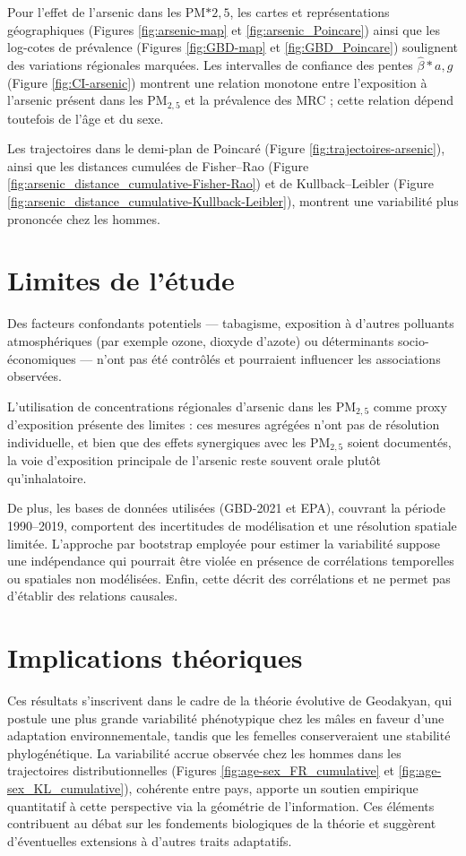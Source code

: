 Pour l'effet de l'arsenic dans les PM$*{2,5}$, les cartes et représentations géographiques (Figures \ref{fig:arsenic-map} et \ref{fig:arsenic_Poincare}) ainsi que les log-cotes de prévalence (Figures \ref{fig:GBD-map} et \ref{fig:GBD_Poincare}) soulignent des variations régionales marquées. Les intervalles de confiance des pentes $\hat{\beta}*{a,g}$ (Figure \ref{fig:CI-arsenic}) montrent une relation monotone entre l'exposition à l'arsenic présent dans les PM$_{2,5}$ et la prévalence des MRC ; cette relation dépend toutefois de l'âge et du sexe.

Les trajectoires dans le demi-plan de Poincaré (Figure \ref{fig:trajectoires-arsenic}), ainsi que les distances cumulées de Fisher–Rao (Figure \ref{fig:arsenic_distance_cumulative-Fisher-Rao}) et de Kullback–Leibler (Figure \ref{fig:arsenic_distance_cumulative-Kullback-Leibler}), montrent une variabilité plus prononcée chez les hommes.

\section{Limites de l'étude}

Des facteurs confondants potentiels — tabagisme, exposition à d'autres polluants atmosphériques (par exemple ozone, dioxyde d'azote) ou déterminants socio-économiques — n'ont pas été contrôlés et pourraient influencer les associations observées. 

L'utilisation de concentrations régionales d'arsenic dans les PM$_{2,5}$ comme proxy d'exposition présente des limites : ces mesures agrégées n'ont pas de résolution individuelle, et bien que des effets synergiques avec les PM$_{2,5}$ soient documentés, la voie d'exposition principale de l'arsenic reste souvent orale plutôt qu'inhalatoire.

De plus, les bases de données utilisées (GBD-2021 et EPA), couvrant la période 1990–2019, comportent des incertitudes de modélisation et une résolution spatiale limitée. L'approche par bootstrap employée pour estimer la variabilité suppose une indépendance qui pourrait être violée en présence de corrélations temporelles ou spatiales non modélisées. Enfin, cette décrit des corrélations et ne permet pas d'établir des relations causales.

\section{Implications théoriques}

Ces résultats s'inscrivent dans le cadre de la théorie évolutive de Geodakyan, qui postule une plus grande variabilité phénotypique chez les mâles en faveur d'une adaptation environnementale, tandis que les femelles conserveraient une stabilité phylogénétique. La variabilité accrue observée chez les hommes dans les trajectoires distributionnelles (Figures \ref{fig:age-sex_FR_cumulative} et \ref{fig:age-sex_KL_cumulative}), cohérente entre pays, apporte un soutien empirique quantitatif à cette perspective via la géométrie de l'information. Ces éléments contribuent au débat sur les fondements biologiques de la théorie et suggèrent d'éventuelles extensions à d'autres traits adaptatifs.

